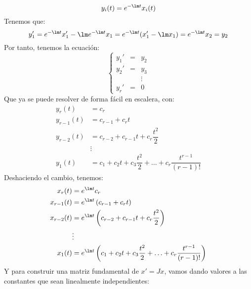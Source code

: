 \begin{enumerate}
\begin{enumerate}
\begin{equation*}
                    y_i(t) = e^{-\lm t}x_i(t)
                \end{equation*}
                Tenemos que:
                \begin{equation*}
                    y_1' = e^{-\lm t}x_1' - \lm e^{-\lm t} x_1 = e^{-\lm t}(x_1' - \lm x_1) = e^{-\lm t} x_2 = y_2
                \end{equation*}
                Por tanto, tenemos la ecuación:
                \begin{equation*}
                    \left\{\begin{array}{ccc}
                            y_1' &=& y_2 \\
                            y_2' &=& y_3 \\
                                 &&\vdots \\
                            y_r' &=& 0
                    \end{array}\right.
                \end{equation*}
                Que ya se puede resolver de forma fácil en escalera, con:
                \begin{align*}
                    y_r(t) &= c_r \\
                    y_{r-1}(t) &= c_{r-1} + c_r t \\
                    y_{r-2}(t) &= c_{r-2} + c_{r-1}t + c_r \dfrac{t^2}{2} \\
                               & \vdots \\
                    y_1(t) &= c_1 + c_2t + c_3 \dfrac{t^2}{2} + \ldots + c_r \dfrac{t^{r-1}}{(r-1)!}
                \end{align*}
                Deshaciendo el cambio, tenemos:
                \begin{align*}
                    x_r(t) &= e^{\lm t} c_r \\
                    x_{r-1}(t) &= e^{\lm t} \left(c_{r-1} + c_r t\right) \\
                    x_{r-2}(t) &= e^{\lm t} \left(c_{r-2} + c_{r-1}t + c_r \dfrac{t^2}{2}\right) \\
                              & \vdots \\
                    x_1(t) &= e^{\lm t} \left(c_1 + c_2t + c_3 \dfrac{t^2}{2} + \ldots + c_r \dfrac{t^{r-1}}{(r-1)!}\right)
                \end{align*}
                Y para construir una matriz fundamental de $x' = Jx$, vamos dando valores a las constantes que sean linealmente independientes:

\end{enumerate}
\end{enumerate}

